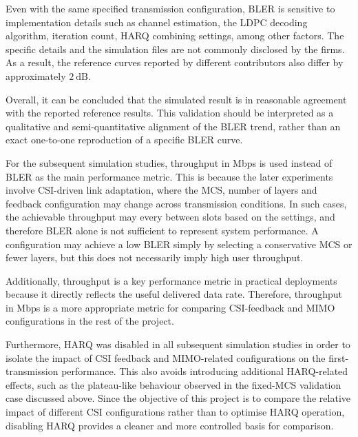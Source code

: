 \documentclass[a4paper,12pt,onecolumn]{article}
\begin{document}
		Even with the same specified transmission configuration, BLER is sensitive to implementation details such as channel estimation, the LDPC decoding algorithm, iteration count, HARQ combining settings, among other factors. The specific details and the simulation files are not commonly disclosed by the firms. As a result, the reference curves reported by different contributors also differ by approximately \(2~\mathrm{dB}\).
		
 		Overall, it can be concluded that the simulated result is in reasonable agreement with the reported reference results. This validation should be interpreted as a qualitative and semi-quantitative alignment of the BLER trend, rather than an exact one-to-one reproduction of a specific BLER curve.

		For the subsequent simulation studies, throughput in Mbps is used instead of BLER as the main performance metric. This is because the later experiments involve CSI-driven link adaptation, where the MCS, number of layers and feedback configuration may change across transmission conditions. In such cases, the achievable throughput may every between slots based on the settings, and therefore BLER alone is not sufficient to represent system performance. A configuration may achieve a low BLER simply by selecting a conservative MCS or fewer layers, but this does not necessarily imply high user throughput. 
		
		Additionally, throughput is a key performance metric in practical deployments because it directly reflects the useful delivered data rate. Therefore, throughput in Mbps is a more appropriate metric for comparing CSI-feedback and MIMO configurations in the rest of the project.
		
		Furthermore, HARQ was disabled in all subsequent simulation studies in order to isolate the impact of CSI feedback and MIMO-related configurations on the first-transmission performance. This also avoids introducing additional HARQ-related effects, such as the plateau-like behaviour observed in the fixed-MCS validation case discussed above. Since the objective of this project is to compare the relative impact of different CSI configurations rather than to optimise HARQ operation, disabling HARQ provides a cleaner and more controlled basis for comparison.
\end{document}

